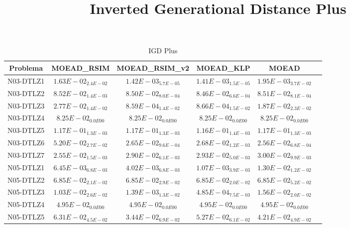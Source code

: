 \documentclass{article}
\title{Inverted Generational Distance Plus}
\author{}
\begin{document}
\maketitle
\begin{table*}[ht!]
\scriptsize
\caption{IGD Plus}
\centering\begin{tabular}{|c||c||c||c||c||c|} \hline
Problema &MOEAD_RSIM &MOEAD_RSIM_v2 &MOEAD_KLP &MOEAD\\\hline
N03-DTLZ1 &$1.63E-02_{2.4E-02}$ &\cellcolor{gray25}$1.42E-03_{5.7E-05}$ &\cellcolor{gray95}$1.41E-03_{1.5E-05}$ &$1.95E-03_{3.7E-02}$\\ 
\hline
N03-DTLZ2 &$8.52E-02_{1.4E-03}$ &\cellcolor{gray25}$8.50E-02_{8.0E-04}$ &\cellcolor{gray95}$8.46E-02_{6.6E-04}$ &$8.51E-02_{8.1E-04}$\\ 
\hline
N03-DTLZ3 &$2.77E-02_{1.4E-02}$ &\cellcolor{gray95}$8.59E-04_{1.4E-02}$ &\cellcolor{gray25}$8.66E-04_{1.5E-02}$ &$1.87E-02_{2.3E-02}$\\ 
\hline
N03-DTLZ4 &\cellcolor{gray95}$8.25E-02_{0.0E00}$ &\cellcolor{gray25}$8.25E-02_{0.0E00}$ &$8.25E-02_{0.0E00}$ &$8.25E-02_{0.0E00}$\\ 
\hline
N03-DTLZ5 &\cellcolor{gray25}$1.17E-01_{1.3E-03}$ &$1.17E-01_{1.3E-03}$ &\cellcolor{gray95}$1.16E-01_{1.4E-03}$ &$1.17E-01_{1.3E-03}$\\ 
\hline
N03-DTLZ6 &$5.20E-02_{2.7E-02}$ &\cellcolor{gray25}$2.65E-02_{9.6E-04}$ &$2.68E-02_{1.2E-03}$ &\cellcolor{gray95}$2.56E-02_{6.8E-04}$\\ 
\hline
N03-DTLZ7 &\cellcolor{gray95}$2.55E-02_{1.5E-03}$ &\cellcolor{gray25}$2.90E-02_{6.1E-03}$ &$2.93E-02_{5.0E-03}$ &$3.00E-02_{9.9E-03}$\\ 
\hline
N05-DTLZ1 &$6.45E-03_{6.8E-03}$ &\cellcolor{gray25}$4.02E-03_{6.8E-03}$ &\cellcolor{gray95}$1.07E-03_{3.9E-03}$ &$1.30E-02_{1.2E-02}$\\ 
\hline
N05-DTLZ2 &\cellcolor{gray25}$6.85E-02_{2.1E-02}$ &$6.85E-02_{2.9E-02}$ &\cellcolor{gray95}$6.85E-02_{2.0E-02}$ &$6.85E-02_{5.2E-02}$\\ 
\hline
N05-DTLZ3 &$1.03E-02_{2.6E-02}$ &\cellcolor{gray25}$1.39E-03_{1.3E-02}$ &\cellcolor{gray95}$4.85E-04_{7.5E-03}$ &$1.56E-02_{2.0E-02}$\\ 
\hline
N05-DTLZ4 &\cellcolor{gray95}$4.95E-02_{0.0E00}$ &\cellcolor{gray25}$4.95E-02_{0.0E00}$ &$4.95E-02_{0.0E00}$ &$4.95E-02_{0.0E00}$\\ 
\hline
N05-DTLZ5 &$6.31E-02_{4.5E-02}$ &\cellcolor{gray95}$3.44E-02_{6.9E-02}$ &$5.27E-02_{6.1E-02}$ &\cellcolor{gray25}$4.21E-02_{4.9E-02}$\\ 

\end{tabular}
\end{table*}
\end{document}

